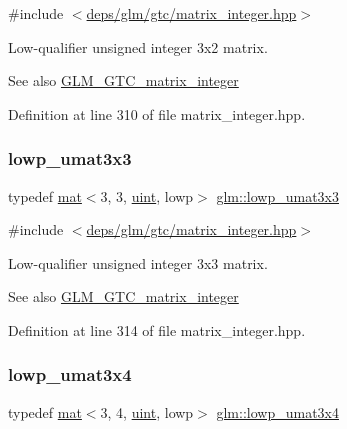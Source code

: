 {\ttfamily \#include $<$\hyperlink{matrix__integer_8hpp}{deps/glm/gtc/matrix\+\_\+integer.\+hpp}$>$}

Low-\/qualifier unsigned integer 3x2 matrix. \begin{DoxySeeAlso}{See also}
\hyperlink{group__gtc__matrix__integer}{G\+L\+M\+\_\+\+G\+T\+C\+\_\+matrix\+\_\+integer} 
\end{DoxySeeAlso}


Definition at line 310 of file matrix\+\_\+integer.\+hpp.

\mbox{\label{group__gtc__matrix__integer_ga267cf15202746fe0bd9b493ce2e98652}} 
\subsubsection{\texorpdfstring{lowp\+\_\+umat3x3}{lowp\_umat3x3}}
{\footnotesize\ttfamily typedef \hyperlink{structglm_1_1mat}{mat}$<$3, 3, \hyperlink{group__core__precision_ga4fd29415871152bfb5abd588334147c8}{uint}, lowp$>$ \hyperlink{group__gtc__matrix__integer_ga267cf15202746fe0bd9b493ce2e98652}{glm\+::lowp\+\_\+umat3x3}}



{\ttfamily \#include $<$\hyperlink{matrix__integer_8hpp}{deps/glm/gtc/matrix\+\_\+integer.\+hpp}$>$}

Low-\/qualifier unsigned integer 3x3 matrix. \begin{DoxySeeAlso}{See also}
\hyperlink{group__gtc__matrix__integer}{G\+L\+M\+\_\+\+G\+T\+C\+\_\+matrix\+\_\+integer} 
\end{DoxySeeAlso}


Definition at line 314 of file matrix\+\_\+integer.\+hpp.

\mbox{\label{group__gtc__matrix__integer_ga5a2dd2a09a6102f298973c41d4597c63}} 
\subsubsection{\texorpdfstring{lowp\+\_\+umat3x4}{lowp\_umat3x4}}
{\footnotesize\ttfamily typedef \hyperlink{structglm_1_1mat}{mat}$<$3, 4, \hyperlink{group__core__precision_ga4fd29415871152bfb5abd588334147c8}{uint}, lowp$>$ \hyperlink{group__gtc__matrix__integer_ga5a2dd2a09a6102f298973c41d4597c63}{glm\+::lowp\+\_\+umat3x4}}




